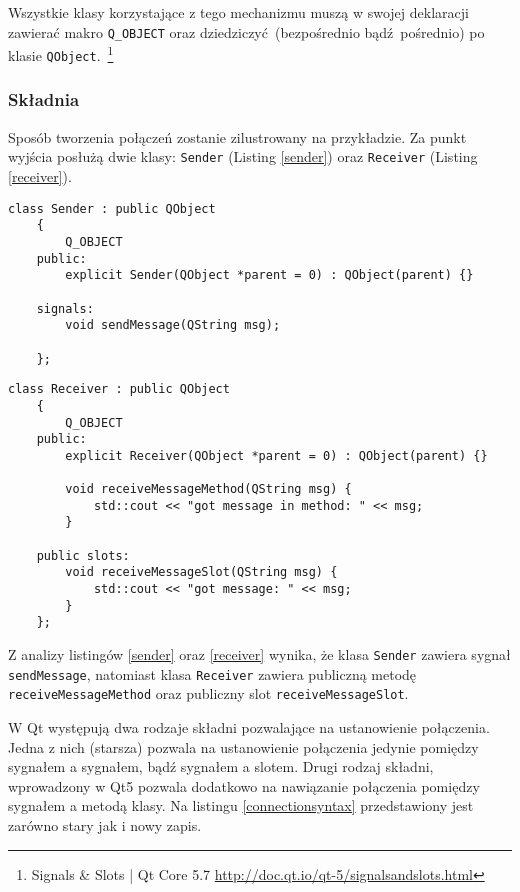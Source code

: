 Wszystkie klasy korzystające z tego mechanizmu muszą w swojej deklaracji zawierać makro \lstinline$Q_OBJECT$ oraz dziedziczyć (bezpośrednio bądź pośrednio) po klasie \lstinline$QObject$.~\footnote{Signals \& Slots | Qt Core 5.7 \url{http://doc.qt.io/qt-5/signalsandslots.html}}


\subsubsection{Składnia} 
Sposób tworzenia połączeń zostanie zilustrowany na przykładzie. Za punkt wyjścia posłużą dwie klasy: \lstinline$Sender$ (Listing \ref{sender}) oraz \lstinline$Receiver$ (Listing \ref{receiver}).

\begin{minipage}{\textwidth}
	\begin{lstlisting}[label=sender,caption=Klasa Sender]
	class Sender : public QObject
	{
		Q_OBJECT
	public:
		explicit Sender(QObject *parent = 0) : QObject(parent) {}
		
	signals:
		void sendMessage(QString msg);
		
	};
	\end{lstlisting}
\end{minipage}

\begin{minipage}{\textwidth}
	\begin{lstlisting}[label=receiver, caption=Klasa Receiver]
	class Receiver : public QObject
	{
		Q_OBJECT
	public:
		explicit Receiver(QObject *parent = 0) : QObject(parent) {}
		
		void receiveMessageMethod(QString msg) {
			std::cout << "got message in method: " << msg;
		}
		
	public slots:
		void receiveMessageSlot(QString msg) {
			std::cout << "got message: " << msg;
		}
	};
	\end{lstlisting}
\end{minipage}

Z analizy listingów \ref{sender} oraz \ref{receiver} wynika, że klasa \lstinline{Sender} zawiera sygnał \lstinline{sendMessage}, natomiast klasa \lstinline{Receiver} zawiera publiczną metodę \lstinline{receiveMessageMethod} oraz publiczny slot \lstinline{receiveMessageSlot}.

W Qt występują dwa rodzaje składni pozwalające na ustanowienie połączenia. Jedna z nich (starsza) pozwala na ustanowienie połączenia jedynie pomiędzy sygnałem a sygnałem, bądź sygnałem a slotem. Drugi rodzaj składni, wprowadzony w Qt5 pozwala dodatkowo na nawiązanie połączenia pomiędzy sygnałem a metodą klasy. Na listingu \ref{connectionsyntax} przedstawiony jest zarówno stary jak i nowy zapis.

